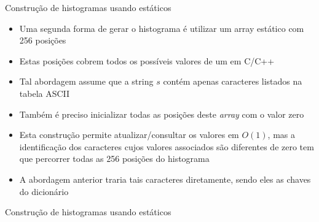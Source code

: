 \begin{frame}[fragile]{Construção de histogramas usando  estáticos}

    \begin{itemize}
        \item Uma segunda forma de gerar o histograma é utilizar um array estático com 256 posições
        \pause

        \item Estas posições cobrem todos os possíveis valores de um  em C/C++
        \pause

        \item Tal abordagem assume que a string $s$ contém apenas caracteres listados na tabela
            ASCII
        \pause

        \item Também é preciso inicializar todas as posições deste \textit{array} com o valor
            zero
        \pause

        \item Esta construção permite atualizar/consultar os valores em $O(1)$, mas a 
            identificação dos caracteres cujos valores associados são diferentes de zero tem
            que percorrer todas as 256 posições do histograma 
        \pause

        \item A abordagem anterior traria tais caracteres diretamente, sendo eles as chaves do dicionário
    \end{itemize}

\end{frame}

\begin{frame}[fragile]{Construção de histogramas usando  estáticos}
\end{frame}

